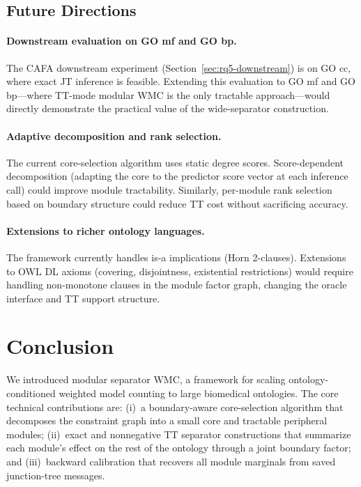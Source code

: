 \documentclass[12pt]{article}
\begin{document}
\subsection{Future Directions}

\paragraph{Downstream evaluation on GO mf and GO bp.}
The CAFA downstream experiment (Section~\ref{sec:rq5-downstream}) is
on GO cc, where exact JT inference is feasible. Extending this
evaluation to GO mf and GO bp---where TT-mode modular WMC is
the only tractable approach---would directly demonstrate the practical
value of the wide-separator construction.

\paragraph{Adaptive decomposition and rank selection.}
The current core-selection algorithm uses static degree scores.
Score-dependent decomposition (adapting the core to the predictor score
vector at each inference call) could improve module tractability.
Similarly, per-module rank selection based on boundary structure could
reduce TT cost without sacrificing accuracy.

\paragraph{Extensions to richer ontology languages.}
The framework currently handles is-a implications (Horn 2-clauses).
Extensions to OWL DL axioms (covering, disjointness, existential
restrictions) would require handling non-monotone clauses in the module
factor graph, changing the oracle interface and TT support structure.

\section{Conclusion}
\label{sec:conclusion}

We introduced modular separator WMC, a framework for scaling
ontology-conditioned weighted model counting to large biomedical
ontologies. The core technical contributions are: (i)~a
boundary-aware core-selection algorithm that decomposes the constraint
graph into a small core and tractable peripheral modules; (ii)~exact
and nonneg\-ative TT separator constructions that summarize each
module's effect on the rest of the ontology through a joint boundary
factor; and (iii)~backward calibration that recovers all module
marginals from saved junction-tree messages.
\end{document}
